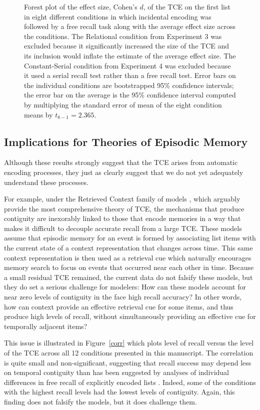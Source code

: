 \documentclass[man,natbib,floatsintext]{apa6} %
\begin{document}
\begin{figure}%
\caption{Forest plot of the effect size, Cohen's $d$, of the TCE on the first list in eight different conditions in which incidental encoding was followed by a free recall task along with the average effect size across the conditions. The Relational condition from Experiment 3 was excluded because it significantly increased the size of the TCE and its inclusion would inflate the estimate of the average effect size. The Constant-Serial condition from Experiment 4 was excluded because it used a serial recall test rather than a free recall test. Error bars on the individual conditions are bootstrapped 95\% confidence intervals; the error bar on the average is the 95\% confidence interval computed by multiplying the standard error of mean of the eight condition means by $t_{8-1}=2.365$.}
\label{meta}
\end{figure}


\subsection{Implications for Theories of Episodic Memory}
Although these results strongly suggest that the TCE arises from automatic encoding processes, they just as clearly suggest that we do not yet adequately understand these processes.

For example, under the Retrieved Context family of models \citep[e.g.,][]{PolyEtal09,LohnEtal14,HealKaha15}, which arguably provide the most comprehensive theory of TCE, the mechanisms that produce contiguity are inexorably linked to those that encode memories in a way that makes it difficult to decouple accurate recall from a large TCE. These models assume that episodic memory for an event is formed by associating list items with the current state of a context representation that changes across time. This same context representation is then used as a retrieval cue which naturally encourages memory search to focus on events that occurred near each other in time. Because a small residual TCE remained, the current data do not falsify these models, but they do set a serious challenge for modelers: How can these models account for near zero levels of contiguity in the face high recall accuracy? In other words, how can context provide an effective retrieval cue for some items, and thus produce high levels of recall, without simultaneously providing an effective cue for temporally adjacent items?

This issue is illustrated in Figure~\ref{corr} which plots level of recall versus the level of the TCE across all 12 conditions presented in this manuscript. The correlation is quite small and non-significant\color{black}, suggesting that recall success may depend less on temporal contiguity than has been suggested by analyses of individual differences in free recall of explicitly encoded lists \citep{SedeEtal10,HealEtal14}. Indeed, some of the conditions with the highest recall levels had the lowest levels of contiguity. Again, this finding does not falsify the models, but it does challenge them.
\end{document}
